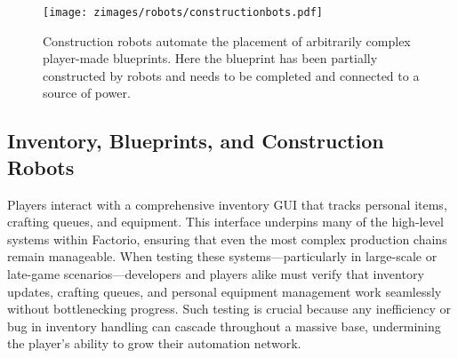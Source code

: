 

\begin{figure}[ht]
    \centering
    \texttt{[image: zimages/robots/constructionbots.pdf]}
    \caption{Construction robots automate the placement of arbitrarily complex player-made blueprints. Here the blueprint has been partially constructed by robots and needs to be completed and connected to a source of power. \cite{constructionBots}}
    \label{fig:constructionBots}
\end{figure}


\subsection{Inventory, Blueprints, and Construction Robots}
Players interact with a comprehensive inventory GUI that tracks personal items, crafting queues, and equipment. This interface underpins many of the high-level systems within Factorio, ensuring that even the most complex production chains remain manageable. When testing these systems—particularly in large-scale or late-game scenarios—developers and players alike must verify that inventory updates, crafting queues, and personal equipment management work seamlessly without bottlenecking progress. Such testing is crucial because any inefficiency or bug in inventory handling can cascade throughout a massive base, undermining the player’s ability to grow their automation network.

